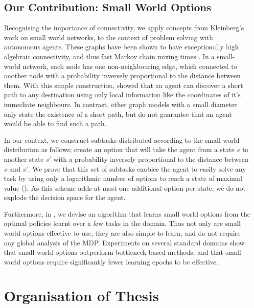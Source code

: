 \subsection{Our Contribution: Small World Options}

Recognising the importance of connectivity, we apply concepts from
Kleinberg's work on small world networks, to the context of problem
solving with autonomous agents. These graphs have been shown to have
exceptionally high algebraic connectivity, and thus fast Markov chain
mixing times \citep{Salehi2007}. In a small-world network, each node has
one non-neighbouring edge, which connected to another node with
a probability inversely proportional to the distance between them. With
this simple construction, \citet{Kleinberg2000} showed that an agent can
discover a short path to any destination using only local information
like the coordinates of it's immediate neighbours. In contrast, other
graph models with a small diameter only state the existence of a short
path, but do not guarantee that an agent would be able to find such
a path. 

In our context, we construct subtasks distributed according to the
small world distribution as follows; create an option that will take
the agent from a state $s$ to another state $s'$ with a probability
inversely proportional to the distance between $s$ and $s'$. We prove
that this set of subtasks enables the agent to easily solve any task
by using only a logarithmic number of options to reach a state of
maximal value (). As this scheme adds at most
one additional option per state, we do not explode the decision space
for the agent.

Furthermore, in , we devise an
algorithm that learns small world options from the optimal policies
learnt over a few tasks in the domain. Thus not only are small world
options effective to use, they are also simple to learn, and do not
require any global analysis of the MDP. Experiments on several
standard domains show that small-world options outperform
bottleneck-based methods, and that small world options require
significantly fewer learning epochs to be effective.

\section{Organisation of Thesis}

